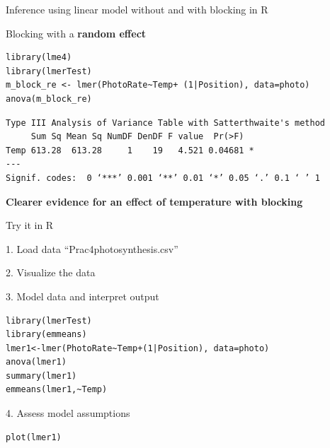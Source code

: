 \documentclass{beamer}
\makeatletter
\newenvironment{kframe}{%
 \def\at@end@of@kframe{}%
 \ifinner\ifhmode%
  \def\at@end@of@kframe{\end{minipage}}%
  \begin{minipage}{\columnwidth}%
 \fi\fi%
 \def\FrameCommand##1{\hskip\@totalleftmargin \hskip-\fboxsep
 \colorbox{shadecolor}{##1}\hskip-\fboxsep
     \hskip-\linewidth \hskip-\@totalleftmargin \hskip\columnwidth}%
 \MakeFramed {\advance\hsize-\width
   \@totalleftmargin\z@ \linewidth\hsize
   \@setminipage}}%
 {\par\unskip\endMakeFramed%
 \at@end@of@kframe}
\newenvironment{knitrout}{}{} %
\makeatother
\begin{document}
\begin{frame}[fragile]{Inference using linear model without and with blocking in R}
 
 Blocking with a \textbf{random effect}
  \begin{knitrout}
\color{fgcolor}\begin{kframe}
\begin{verbatim}
library(lme4)
library(lmerTest)
m_block_re <- lmer(PhotoRate~Temp+ (1|Position), data=photo)
anova(m_block_re)
\end{verbatim}
\end{kframe}
\end{knitrout}

\begin{knitrout}
\color{fgcolor}\begin{kframe}
\begin{verbatim}
Type III Analysis of Variance Table with Satterthwaite's method
     Sum Sq Mean Sq NumDF DenDF F value  Pr(>F)  
Temp 613.28  613.28     1    19   4.521 0.04681 *
---
Signif. codes:  0 ‘***’ 0.001 ‘**’ 0.01 ‘*’ 0.05 ‘.’ 0.1 ‘ ’ 1
\end{verbatim}
\end{kframe}
\end{knitrout}
 
 \textbf{Clearer evidence for an effect of temperature with blocking}
 
\end{frame}

\begin{frame}[fragile]{Try it in R}

1. Load data ``Prac4photosynthesis.csv''

2. Visualize the data

3. Model data and interpret output
\begin{knitrout}
\color{fgcolor}\begin{kframe}
\begin{verbatim}
library(lmerTest)
library(emmeans)
lmer1<-lmer(PhotoRate~Temp+(1|Position), data=photo)
anova(lmer1)
summary(lmer1)
emmeans(lmer1,~Temp)
\end{verbatim}
\end{kframe}
\end{knitrout}

4. Assess model assumptions
\begin{knitrout}
\color{fgcolor}\begin{kframe}
\begin{verbatim}
plot(lmer1)
\end{verbatim}
\end{kframe}
\end{knitrout}


\end{frame}
\end{document}
